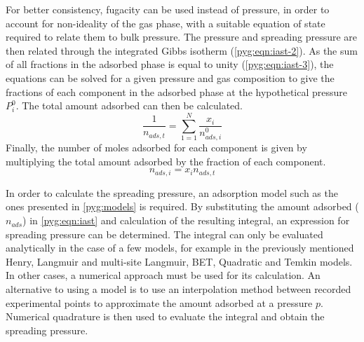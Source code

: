 For better consistency, fugacity can be used instead of pressure,
in order to account for non-ideality of the gas phase,
with a suitable equation of state required to relate them to bulk pressure.
The pressure and spreading pressure are then related through
the integrated Gibbs isotherm (\autoref{pyg:eqn:iast-2}). As the sum of all
fractions in the adsorbed phase is equal to unity (\autoref{pyg:eqn:iast-3}),
the equations can be solved for a given pressure and gas composition to give
the fractions of each component in the adsorbed phase at the hypothetical
pressure \(P_{i}^{0}\). The total amount adsorbed can then be calculated.
%
\begin{equation}
	\frac{1}{n_{ads,t}} = \sum_{1=1}^{N} \frac{x_i}{n_{ads,i}^0}
\end{equation}
%
Finally, the number of moles adsorbed for each component is given
by multiplying the total amount adsorbed by the fraction of each
component.
%
\begin{equation}
	n_{ads, i} = x_i n_{ads,t}
\end{equation}

In order to calculate the spreading pressure, an adsorption model
such as the ones presented in \autoref{pyg:models} is required.
By substituting the amount adsorbed (\(n_{ads}\)) in \autoref{pyg:eqn:iast}
and calculation of the resulting integral, an expression for
spreading pressure can be determined. The integral can only be
evaluated analytically in the case of a few models, for example in
the previously mentioned Henry, Langmuir and multi-site Langmuir,
BET, Quadratic and Temkin models. In other cases, a numerical approach
must be used for its calculation. An alternative to using a
model is to use an interpolation method between recorded experimental
points to approximate the amount adsorbed at a pressure \(p\). Numerical
quadrature is then used to evaluate the integral and obtain the
spreading pressure.